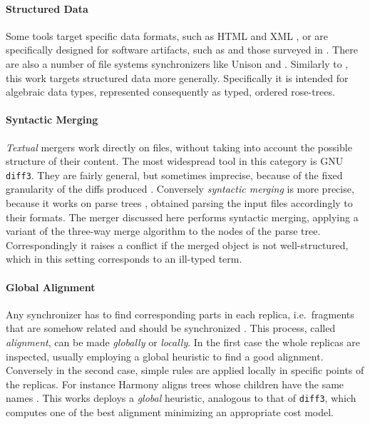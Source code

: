 \documentclass[../Thesis.tex]{subfiles}
\begin{document}
	\paragraph{Structured Data}
	 Some tools target specific data formats, such as HTML and XML
	 \cite{Lind04, Lind05}, or are specifically designed for software 
	 artifacts, such as \cite{Apel11, Westfechtel91} and those surveyed in 
	 \cite{Mens02}.	 
	 There are also a number of file systems synchronizers like Unison
	 \cite{Pierce98, UnisonSpec} and	 \cite{Ramsey01}.	 
	 Similarly to \cite{Chawathe96, Chawathe97}, this work targets structured 
	 data more generally.
	 Specifically it is intended for algebraic data types, represented 
	 consequently as typed, ordered rose-trees.
	 
	\paragraph{Syntactic Merging}	
	\emph{Textual} mergers work directly on files, without taking into account 
	the possible structure of their content. The most widespread tool in this 
	category is GNU \texttt{diff3}. 
	They are fairly general, but sometimes imprecise, because of the fixed
	granularity of the diffs produced \cite{Mens02}.
	Conversely \emph{syntactic merging} is more precise, because it 
	works on parse trees \cite{Mens02}, obtained parsing the input files
	accordingly to their formats.
	The merger discussed here performs syntactic merging, applying
	a variant of the three-way merge algorithm to the nodes of the parse tree.
	Correspondingly it raises a conflict if the merged
	object is not well-structured, which in this setting corresponds to 
	an ill-typed term.
	
	\paragraph{Global Alignment}
	Any synchronizer has to find corresponding parts in each replica, i.e.\
	fragments that are somehow related and should be synchronized 
	\cite{Pierce07}.
	This process, called \emph{alignment}, can be made \emph{globally} or 
	\emph{locally}. In the first case the whole replicas are inspected, usually
	employing a global heuristic to find a good alignment. 
	Conversely in the second case, simple rules are applied locally in specific 
	points of the replicas. For instance Harmony aligns trees whose
	children have the same names \cite{Pierce07}.
	This works deploys a \emph{global} heuristic, analogous to that
	of \texttt{diff3}, which computes one of the best alignment minimizing an
	appropriate cost model.	
	
\end{document}
